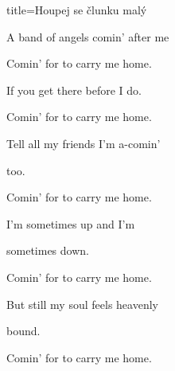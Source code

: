 \begin{song}{title=\predtitle\centering Houpej se člunku malý \\\large \vspace*{-0.3cm}}
{\begin{centerjustified}
\begin{varwidth}[t]{0.48\textwidth}
A band of angels comin' after me

Comin' for to carry me home.




\sloka
If you get there before I do.

Comin' for to carry me home.

Tell all my friends I'm a-comin' 

too.

Comin' for to carry me home.




\sloka
I'm sometimes up and I'm 

sometimes down.

Comin' for to carry me home.

But still my soul feels heavenly 

bound.

Comin' for to carry me home.



\end{varwidth}

\end{centerjustified}
}

\centering
{}

\setcounter{Slokočet}{0}
\end{song}
